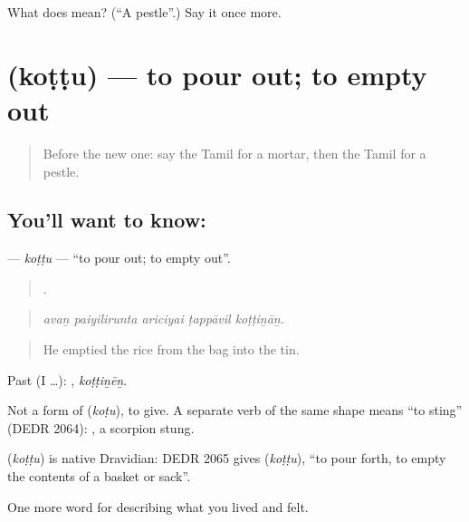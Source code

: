 \begin{tcolorbox}[breakable,colback=teal!4,colframe=teal!35!black,title={Before you move on}]
What does  mean? (\textquotedblleft{}A pestle\textquotedblright{}.) Say it once more.
\end{tcolorbox}
\section[\texorpdfstring{\ta{கொட்டு} (koṭṭu)}{கொட்டு (koṭṭu)}]{ (koṭṭu) — to pour out; to empty out}

\label{lesson:TA-C524-kottu}



\begin{quote}
Before the new one: say the Tamil for a mortar, then the Tamil for a pestle.
\end{quote}

\subsection*{You'll want to know: }
\textbf{} — \emph{koṭṭu} — \textquotedblleft{}to pour out; to empty out\textquotedblright{}.

\begin{quote}
    .
\end{quote}

\begin{quote}
\emph{avaṉ paiyilirunta ariciyai ṭappāvil koṭṭiṉāṉ.}
\end{quote}

\begin{quote}
He emptied the rice from the bag into the tin.
\end{quote}

Past (I …): , \emph{koṭṭiṉēṉ}.

Not a form of  (\emph{koṭu}), to give. A separate verb of the same shape means \textquotedblleft{}to sting\textquotedblright{} (DEDR 2064):  , a scorpion stung.

\begin{cousinweb}
\textbf{} (\emph{koṭṭu}) is native Dravidian: DEDR 2065 gives  (\emph{koṭṭu}), \textquotedblleft{}to pour forth, to empty the contents of a basket or sack\textquotedblright{}.
\end{cousinweb}

\begin{grammarlens}[title={What you've built}]
One more word for describing what you lived and felt.
\end{grammarlens}

